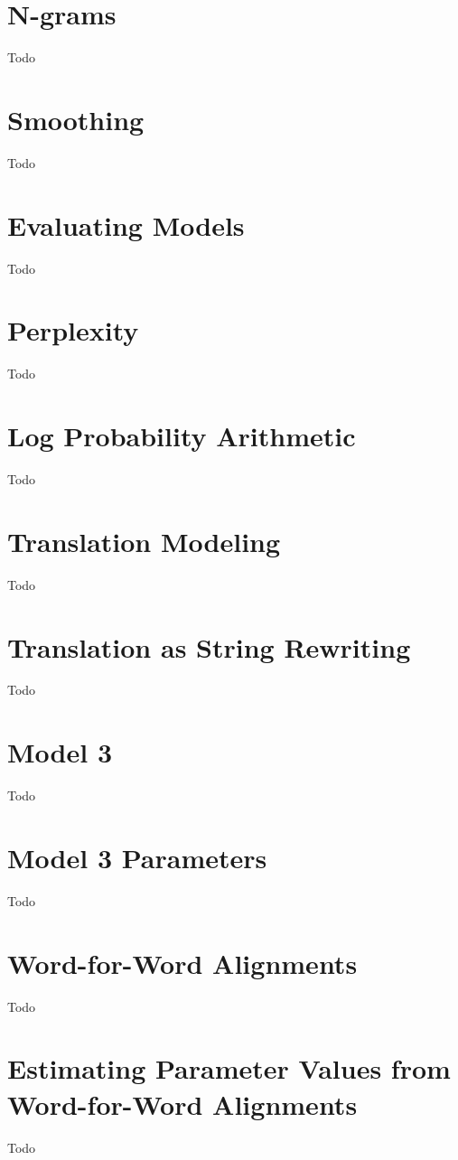 \documentclass[a4paper]{article}
\begin{document}
\section{N-grams}
Todo

\section{Smoothing}
Todo

\section{Evaluating Models}
Todo

\section{Perplexity}
Todo

\section{Log Probability Arithmetic}
Todo

\section{Translation Modeling}
Todo

\section{Translation as String Rewriting}
Todo

\section{Model 3}
Todo

\section{Model 3 Parameters}
Todo

\section{Word-for-Word Alignments}
Todo

\section{Estimating Parameter Values from Word-for-Word Alignments}
Todo
\end{document}
